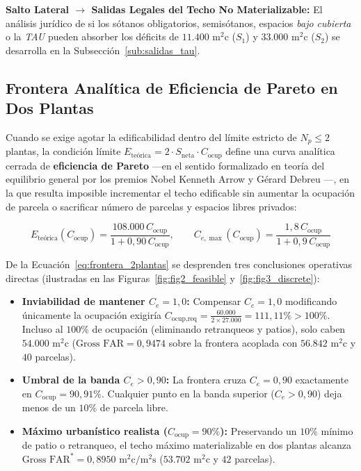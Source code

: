 \begin{tcolorbox}[jumpbox]
\textbf{Salto Lateral $\to$ Salidas Legales del Techo No Materializable:} El análisis jurídico de si los sótanos obligatorios, semisótanos, espacios \emph{bajo cubierta} o la \emph{TAU} pueden absorber los déficits de $11.400\text{ m}^2\text{c}$ ($S_1$) y $33.000\text{ m}^2\text{c}$ ($S_2$) se desarrolla en la Subsección~\ref{sub:salidas_tau}.
\end{tcolorbox}

\subsection{Frontera Analítica de Eficiencia de Pareto en Dos Plantas}
\label{sub:frontera_pareto}

Cuando se exige agotar la edificabilidad dentro del límite estricto de $N_p \le 2$ plantas, la condición límite $E_{\text{teórica}} = 2 \cdot S_{\text{neta}} \cdot C_{\text{ocup}}$ define una curva analítica cerrada de \textbf{eficiencia de Pareto} —en el sentido formalizado en teoría del equilibrio general por los premios Nobel Kenneth Arrow y Gérard Debreu \cite{arrow1954existence}—, en la que resulta imposible incrementar el techo edificable sin aumentar la ocupación de parcela o sacrificar número de parcelas y espacios libres privados:

\begin{equation}
  E_{\text{teórica}}(C_{\text{ocup}}) = \frac{108.000\,C_{\text{ocup}}}{1 + 0,90\,C_{\text{ocup}}}, \qquad
  C_{e,\max}(C_{\text{ocup}}) = \frac{1,8\,C_{\text{ocup}}}{1 + 0,9\,C_{\text{ocup}}}
  \label{eq:frontera_2plantas}
\end{equation}

De la Ecuación~\eqref{eq:frontera_2plantas} se desprenden tres conclusiones operativas directas (ilustradas en las Figuras~\ref{fig:fig2_feasible} y~\ref{fig:fig3_discrete}):
\begin{itemize}
  \item \textbf{Inviabilidad de mantener $C_e = 1,0$:} Compensar $C_e = 1,0$ modificando únicamente la ocupación exigiría $C_{\text{ocup,req}} = \frac{60.000}{2 \times 27.000} = 111,11\% > 100\%$. Incluso al $100\%$ de ocupación (eliminando retranqueos y patios), solo caben $54.000\text{ m}^2\text{c}$ ($\text{Gross FAR} = 0,9474$ sobre la frontera acoplada con $56.842\text{ m}^2\text{c}$ y $40$ parcelas).
  \item \textbf{Umbral de la banda $C_e > 0,90$:} La frontera cruza $C_e = 0,90$ exactamente en $C_{\text{ocup}} = 90,91\%$. Cualquier punto en la banda superior ($C_e > 0,90$) deja menos de un $10\%$ de parcela libre.
  \item \textbf{Máximo urbanístico realista ($C_{\text{ocup}} = 90\%$):} Preservando un $10\%$ mínimo de patio o retranqueo, el techo máximo materializable en dos plantas alcanza $\text{Gross FAR}^* = 0,8950\text{ m}^2\text{c}/\text{m}^2\text{s}$ ($53.702\text{ m}^2\text{c}$ y $42$ parcelas).
\end{itemize}


